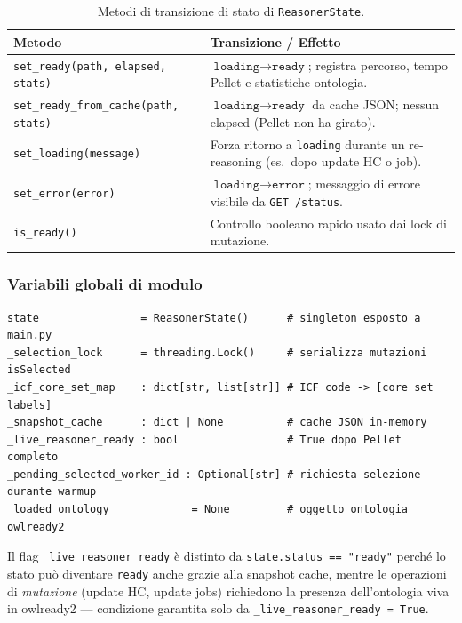 \documentclass[a4paper,12pt]{article}
\begin{document}
\begin{table}[H]
\centering
\caption{Metodi di transizione di stato di \texttt{ReasonerState}.}
\begin{tabular}{L{5.8cm} L{6.7cm}}
\toprule
\textbf{Metodo} & \textbf{Transizione / Effetto} \\
\midrule
\texttt{set\_\allowbreak{}ready(path, elapsed, stats)} &
  $\texttt{loading} \rightarrow \texttt{ready}$; registra percorso, tempo
  Pellet e statistiche ontologia. \\[4pt]
\texttt{set\_\allowbreak{}ready\_\allowbreak{}from\_\allowbreak{}cache(path, stats)} &
  $\texttt{loading} \rightarrow \texttt{ready}$ da cache JSON; nessun
  elapsed (Pellet non ha girato). \\[4pt]
\texttt{set\_loading(message)} &
  Forza ritorno a \texttt{loading} durante un re-reasoning
  (es.\ dopo update HC o job). \\[4pt]
\texttt{set\_error(error)} &
  $\texttt{loading} \rightarrow \texttt{error}$; messaggio di errore
  visibile da \texttt{GET /status}. \\[4pt]
\texttt{is\_ready()} &
  Controllo booleano rapido usato dai lock di mutazione. \\
\bottomrule
\end{tabular}
\end{table}

\subsubsection{Variabili globali di modulo}
\vspace{2pt}
\begin{lstlisting}[caption={Variabili globali di stato e cache.}]
state                = ReasonerState()      # singleton esposto a main.py
_selection_lock      = threading.Lock()     # serializza mutazioni isSelected
_icf_core_set_map    : dict[str, list[str]] # ICF code -> [core set labels]
_snapshot_cache      : dict | None          # cache JSON in-memory
_live_reasoner_ready : bool                 # True dopo Pellet completo
_pending_selected_worker_id : Optional[str] # richiesta selezione durante warmup
_loaded_ontology             = None         # oggetto ontologia owlready2
\end{lstlisting}

\noindent Il flag \texttt{\_live\_reasoner\_ready} \`{e} distinto da
\texttt{state.status == "ready"} perch\'{e} lo stato pu\`{o} diventare
\texttt{ready} anche grazie alla snapshot cache, mentre le operazioni
di \textit{mutazione} (update HC, update jobs) richiedono la presenza
dell'ontologia viva in owlready2 --- condizione garantita solo da
\texttt{\_live\_reasoner\_ready = True}.
\end{document}
